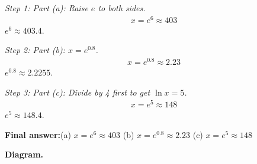 \documentclass[11pt]{article}
\begin{document}
\textit{Step 1: Part (a): Raise \( e \) to both sides.}
\[\begin{gathered}
x = e^6 \approx 403
\end{gathered}\]
\( e^6 \approx 403.4 \).

\textit{Step 2: Part (b): \( x = e^{0.8} \).}
\[\begin{gathered}
x = e^{0.8} \approx 2.23
\end{gathered}\]
\( e^{0.8} \approx 2.2255 \).

\textit{Step 3: Part (c): Divide by 4 first to get \( \ln x = 5 \).}
\[\begin{gathered}
x = e^5 \approx 148
\end{gathered}\]
\( e^5 \approx 148.4 \).

\begin{answerbox}
\textbf{Final answer:}\quad (a) \(\displaystyle  x = e^6 \approx 403 \) \quad  (b) \(\displaystyle  x = e^{0.8} \approx 2.23 \) \quad  (c) \(\displaystyle  x = e^5 \approx 148 \)
\end{answerbox}
\textbf{Diagram.}
\end{document}
